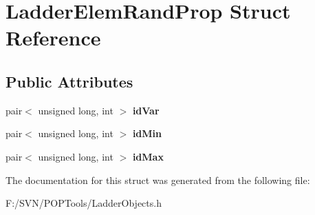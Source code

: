 \hypertarget{struct_ladder_elem_rand_prop}{\section{Ladder\-Elem\-Rand\-Prop Struct Reference}
\label{struct_ladder_elem_rand_prop}
}
\subsection*{Public Attributes}
\begin{DoxyCompactItemize}
\item 
\hypertarget{struct_ladder_elem_rand_prop_ac3c90778036fe78eb883eaa8ee3850a6}{pair$<$ unsigned long, int $>$ {\bfseries id\-Var}}\label{struct_ladder_elem_rand_prop_ac3c90778036fe78eb883eaa8ee3850a6}

\item 
\hypertarget{struct_ladder_elem_rand_prop_a3bc25fbeef0b2833360c54bd3194a7b7}{pair$<$ unsigned long, int $>$ {\bfseries id\-Min}}\label{struct_ladder_elem_rand_prop_a3bc25fbeef0b2833360c54bd3194a7b7}

\item 
\hypertarget{struct_ladder_elem_rand_prop_a90f21a722a445a50511be722e2bdf95e}{pair$<$ unsigned long, int $>$ {\bfseries id\-Max}}\label{struct_ladder_elem_rand_prop_a90f21a722a445a50511be722e2bdf95e}

\end{DoxyCompactItemize}


The documentation for this struct was generated from the following file\-:\begin{DoxyCompactItemize}
\item 
F\-:/\-S\-V\-N/\-P\-O\-P\-Tools/Ladder\-Objects.\-h\end{DoxyCompactItemize}
